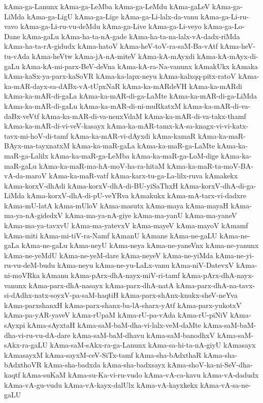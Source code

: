 {kAma-ga-Lanunx
kAma-ga-LeMba
kAma-ga-LeMdu
kAma-gaLeV
kAma-ga-LiMda
kAma-ga-LigU
kAma-ga-Lige
kAma-ga-Li-lalx-da-vanu
kAma-ga-Li-ru-vavo
kAma-ga-Li-ru-vu-deMdu
kAma-ga-Live
kAma-ga-Li-veyo
kAma-ga-Lo-Dane
kAma-gaLu
kAma-ha-ta-nA-gade
kAma-ha-ta-na-lalx-vA-dadx-riMda
kAma-ha-ta-rA-gidudx
kAma-hatoV
kAma-heV-toV-ra-saM-Ba-vAtf
kAma-heV-tu-vAda
kAma-heVtw
kAma-jA-nA-miteV
kAma-kA-mAyxdi
kAma-kA-mAyx-di-gaLu
kAma-kA-mi-parx-BeV-deVna
kAma-kA-ra-Na-vanunx
kAmakUkx
kAmaka
kAma-kaSx-ya-parx-kaSoVR
kAma-ka-lapx-neyu
kAma-kalxqq-pitx-ratoV
kAma-ka-mAR-dayx-sa-dABx-vA-tUpxNaR
kAma-ka-mARdeVH
kAma-ka-mARdi
kAma-ka-mAR-di-gaLa
kAma-ka-mAR-di-ga-LaMte
kAma-ka-mAR-di-ga-LiMda
kAma-ka-mAR-di-gaLu
kAma-ka-mAR-di-ni-muRkatxM
kAma-ka-mAR-di-va-daBx-veVtf
kAma-ka-mAR-di-va-nenxVdaM
kAma-ka-mAR-di-va-takx-thamf
kAma-ka-mAR-di-vi-veV-kasayx
kAma-ka-mAR-tamx-kA-sa-knagx-vi-vi-katx-tavx-mi-hoV-di-tamf
kAma-ka-mAR-vi-dAyxdi
kAma-kamaR
kAma-ka-maR-BAyx-ma-tayxnatxM
kAma-ka-maR-gaLa
kAma-ka-maR-ga-LaMte
kAma-ka-maR-ga-Lalilx
kAma-ka-maR-ga-LeMba
kAma-ka-maR-ga-LoM-dige
kAma-ka-maR-gaLu
kAma-ka-maR-ma-hA-moV-ha-ra-hitaM
kAma-ka-maR-ta-moV-BA-vA-da-maroV
kAma-ka-maR-vatf
kAma-karx-tu-ga-La-lilx-ruva
kAmakekx
kAma-korxV-dhAdi
kAma-korxV-dhA-di-BU-yiSaThxH
kAma-korxV-dhA-di-ga-LiMda
kAma-korxV-dhA-di-pU-veYRva
kAmakukx
kAma-mA-tarx-vi-dadxre
kAma-mU-latA
kAma-mUloV
kAma-masutx
kAma-maya
kAma-mayaH
kAma-ma-ya-nA-gidedxV
kAma-ma-ya-nA-giye
kAma-ma-yanU
kAma-ma-yaneV
kAma-ma-ya-tavxvU
kAma-ma-yatevxV
kAma-mayeV
kAma-mayoV
kAmamf
kAma-miti
kAma-mi-tiV-ra-Namf
kAmanU
kAmane
kAma-ne-gaLU
kAma-ne-gaLa
kAma-ne-gaLu
kAma-neyU
kAma-neya
kAma-ne-yaneVnx
kAma-ne-yanunx
kAma-ne-yeMdU
kAma-ne-yeM-dare
kAma-neyeV
kAma-ne-yiMda
kAma-ne-yi-ru-vu-deM-budu
kAma-neyu
kAma-ne-yu-LaLx-vanu
kAma-niV-DatevxV
kAma-ni-moVRka
kAmanu
kAma-pArx-dhA-nayx-miV-ri-tamf
kAma-pArx-dhA-nayx-vanunx
kAma-parx-dhA-nasayx
kAma-parx-dhA-natA
kAma-parx-dhA-na-tavx-si-dAdhx-natx-soyxV-pa-saM-haqtiH
kAma-parx-shAnx-knukx-sheV-neYva
kAma-parxshanxH
kAma-parx-shanx-ba-lA-sharx-yAtf
kAma-parx-yukotxV
kAma-pa-yAR-yaveV
kAma-rUpaM
kAma-rU-pa-vAda
kAma-rU-piNiV
kAma-sAyxpi
kAma-sAyxtaH
kAma-saM-baM-dha-vi-lalx-veM-daMte
kAma-saM-baM-dha-vi-ru-vu-dA-dare
kAma-saM-baM-dhavu
kAma-saM-banodhxV
kAma-saM-sAkx-ra-gaLU
kAma-saM-sAkx-ra-ga-Lanunx
kAma-sa-hi-ta-nA-giyU
kAmasayx
kAmasayxM
kAma-sayxM-ceV-SiTx-tamf
kAma-sha-bAdxthaR
kAma-sha-bAdxthoVR
kAma-sha-badxda
kAma-sha-badxsayx
kAma-shoV-ka-ni-SeV-dha-kaqtf
kAma-suKaM
kAma-su-Ka-vi-ru-vudo
kAma-vA-ca-kavu
kAma-vA-dadudx
kAma-vA-gu-vudu
kAma-vA-kayx-dalUlx
kAma-vA-kayxkekx
kAma-vA-sa-ne-gaLU
}
